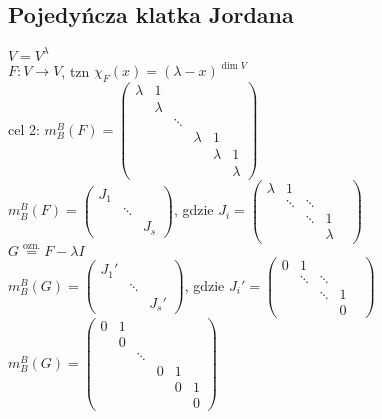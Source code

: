 \subsection{Pojedyńcza klatka Jordana} 
$V = V^\lambda$ \\ 
$F: V \to V$, tzn $\chi_F (x) = (\lambda-x)^{\dim V}$ \\
cel 2: 
$m_B^B (F) = \begin{pmatrix} \lambda & 1 & & & & \\ 
                                     & \lambda & & & & \\
                                     & & \ddots & & & \\ 
                                     & & & \lambda & 1 & \\ 
                                     & & & & \lambda & 1 \\
                                     & & & & & \lambda
                                    \end{pmatrix} $ \\ 
$m_B^B (F) = \begin{pmatrix} J_1 & & \\ & \ddots & \\ & & J_s \end{pmatrix}$, gdzie
$J_i = \begin{pmatrix} \lambda & 1 & & & \\ & \ddots & \ddots & & \\ 
        & & \ddots & 1 \\ & & &  \lambda \end{pmatrix}$ \\ 
$G \overset{\text{ozn.}}{=} F - \lambda I$ \\ 
$m_B^B (G) = \begin{pmatrix} J_1 ' & & \\ & \ddots & \\ & & J_s' \end{pmatrix}$, gdzie
$J_i' = \begin{pmatrix} 0 & 1 & & & \\ & \ddots & \ddots & & \\ 
            & & \ddots & 1 \\ & & &  0 \end{pmatrix}$ \\ 
$m_B^B (G) = \begin{pmatrix} 0 & 1 & & & & \\ 
                                     & 0 & & & & \\
                                     & & \ddots & & & \\ 
                                     & & & 0 & 1 & \\ 
                                     & & & & 0 & 1 \\
                                     & & & & & 0
                                    \end{pmatrix} $ \\
